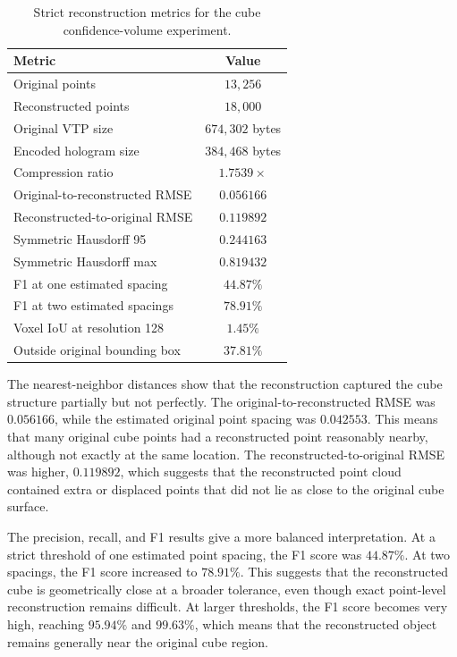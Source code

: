 \documentclass{article}
\begin{document}
\begin{normalsize}
\begin{table}[H]
\centering
\scriptsize
\begin{tabular}{|l|c|}
\hline
\textbf{Metric} & \textbf{Value} \\
\hline
Original points & \(13{,}256\) \\
\hline
Reconstructed points & \(18{,}000\) \\
\hline
Original VTP size & \(674{,}302\) bytes \\
\hline
Encoded hologram size & \(384{,}468\) bytes \\
\hline
Compression ratio & \(1.7539\times\) \\
\hline
Original-to-reconstructed RMSE & \(0.056166\) \\
\hline
Reconstructed-to-original RMSE & \(0.119892\) \\
\hline
Symmetric Hausdorff 95 & \(0.244163\) \\
\hline
Symmetric Hausdorff max & \(0.819432\) \\
\hline
F1 at one estimated spacing & \(44.87\%\) \\
\hline
F1 at two estimated spacings & \(78.91\%\) \\
\hline
Voxel IoU at resolution 128 & \(1.45\%\) \\
\hline
Outside original bounding box & \(37.81\%\) \\
\hline
\end{tabular}
\caption{Strict reconstruction metrics for the cube confidence-volume experiment.}
\label{tab:cube_confidence_metrics}
\end{table}

The nearest-neighbor distances show that the reconstruction captured the cube structure partially but not perfectly. The original-to-reconstructed RMSE was \(0.056166\), while the estimated original point spacing was \(0.042553\). This means that many original cube points had a reconstructed point reasonably nearby, although not exactly at the same location. The reconstructed-to-original RMSE was higher, \(0.119892\), which suggests that the reconstructed point cloud contained extra or displaced points that did not lie as close to the original cube surface.

The precision, recall, and F1 results give a more balanced interpretation. At a strict threshold of one estimated point spacing, the F1 score was \(44.87\%\). At two spacings, the F1 score increased to \(78.91\%\). This suggests that the reconstructed cube is geometrically close at a broader tolerance, even though exact point-level reconstruction remains difficult. At larger thresholds, the F1 score becomes very high, reaching \(95.94\%\) and \(99.63\%\), which means that the reconstructed object remains generally near the original cube region.


\end{normalsize}
\end{document}

